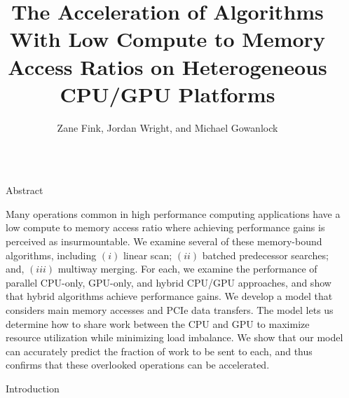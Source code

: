 \documentclass[final]{beamer}
\title{The Acceleration of Algorithms With Low Compute to Memory Access Ratios on Heterogeneous CPU/GPU Platforms}
\author{Zane Fink\inst{1}, Jordan Wright\inst{1}, and Michael Gowanlock\inst{1}}
\institute[shortinst]{\inst{1} School of Informatics, Computing, and Cyber Systems at Northern Arizona University}
\newlength{\sepwidth}
\newlength{\colwidth}
\newcommand{\separatorcolumn}{\begin{column}{\sepwidth}\end{column}}
\begin{document}
\begin{frame}[t]
\begin{columns}[t]
\separatorcolumn

\begin{column}{\colwidth}

  \begin{block}{Abstract}


   Many operations common in high performance computing applications have a low compute to memory access ratio where achieving performance gains is perceived as insurmountable.
   We examine several of these memory-bound algorithms, 
   including $(i)$ linear scan; $(ii)$ batched predecessor searches; and, $(iii)$ multiway merging. 
   For each, we examine the performance of parallel CPU-only, GPU-only, and hybrid CPU/GPU approaches, and show 
   that hybrid algorithms achieve performance gains. We develop a model that considers 
   main memory accesses and PCIe data transfers. The model lets us determine how to share work between the CPU and GPU to maximize resource 
   utilization while minimizing load imbalance. We show that our model can accurately predict the fraction of work 
   to be sent to each, and thus confirms that these overlooked operations can be 
   accelerated. 
  \end{block}

  \begin{block}{Introduction}
    
\begin{description}[font=$\bullet$~\normalfont\scshape\color{red!50!black}]


\end{description}
\end{block}
\end{column}
\end{columns}
\end{frame}
\end{document}
